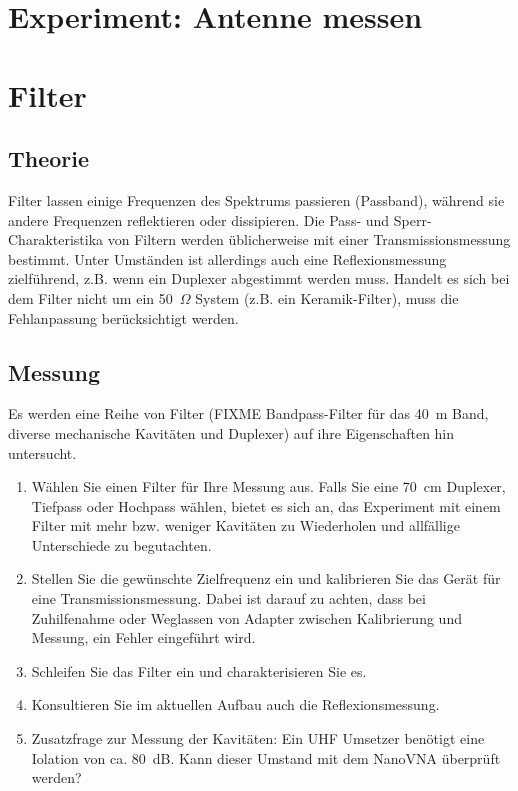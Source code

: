 \documentclass[twoside,a4paper,11pt,halfparskip,DIV=11,notitlepage]{scrartcl}
\begin{document}
\section{Experiment: Antenne messen}

\section{Filter}\label{sec:filter}

\subsection{Theorie}
Filter lassen einige Frequenzen des Spektrums passieren (Passband), während
sie andere Frequenzen reflektieren oder dissipieren. Die Pass- und Sperr-Charakteristika von Filtern werden üblicherweise mit einer
Transmissionsmessung bestimmt. Unter Umständen ist allerdings
auch eine Reflexionsmessung zielführend, z.B. wenn ein Duplexer abgestimmt
werden muss. Handelt es sich bei dem Filter nicht um ein 50~$\Omega$ System
(z.B. ein Keramik-Filter), muss die Fehlanpassung berücksichtigt werden.

\subsection{Messung}
Es werden eine Reihe von Filter (FIXME Bandpass-Filter für das 40~m Band,
diverse mechanische Kavitäten und Duplexer) auf ihre Eigenschaften hin
untersucht.

\begin{enumerate}
    \item Wählen Sie einen Filter für Ihre Messung aus. Falls Sie eine 70~cm
        Duplexer, Tiefpass oder Hochpass wählen, bietet es sich an, das Experiment
        mit einem Filter mit mehr bzw. weniger Kavitäten zu Wiederholen und
        allfällige Unterschiede zu begutachten.
    \item Stellen Sie die gewünschte Zielfrequenz ein und kalibrieren Sie das
        Gerät für eine Transmissionsmessung. Dabei ist darauf zu achten, dass
        bei Zuhilfenahme oder Weglassen von Adapter zwischen Kalibrierung und
        Messung, ein Fehler eingeführt wird.
    \item Schleifen Sie das Filter ein und charakterisieren Sie es.
    \item Konsultieren Sie im aktuellen Aufbau auch die Reflexionsmessung.
    \item Zusatzfrage zur Messung der Kavitäten: Ein UHF Umsetzer benötigt eine
        Iolation von ca. 80~dB. Kann dieser Umstand mit dem NanoVNA überprüft werden?


\end{enumerate}
\end{document}
